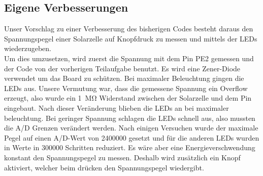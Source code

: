 \subsection{Eigene Verbesserungen}
Unser Vorschlag zu einer Verbesserung des bisherigen Codes besteht daraus den Spannungspegel einer Solarzelle auf Knopfdruck zu messen und mittels der LEDs wiederzugeben. \\ 
Um dies umzusetzen, wird zuerst die Spannung mit dem Pin PE2 gemessen und der Code von der vorherigen Teilaufgabe benutzt. Es wird eine Zener-Diode verwendet um das Board zu schützen.  Bei maximaler Beleuchtung gingen die LEDs aus. Unsere Vermutung war, dass die gemessene Spannung ein Overflow erzeugt, also wurde ein \SI{1}{\mega \ohm} Widerstand zwischen der Solarzelle und dem Pin eingebaut. Nach dieser Veränderung blieben die LEDs an bei maximaler beleuchtung. Bei geringer Spannung schlagen die LEDs schnell aus, also mussten die A/D Grenzen verändert werden. Nach einigen Versuchen wurde der maximale Pegel auf einen A/D-Wert von 2400000 gesetzt und für die anderen LEDs wurden in Werte in 300000 Schritten reduziert. Es wäre aber eine Energieverschwendung konstant den Spannungspegel zu messen. Deshalb wird zusätzlich ein Knopf aktiviert, welcher beim drücken den Spannungspegel wiedergibt.

